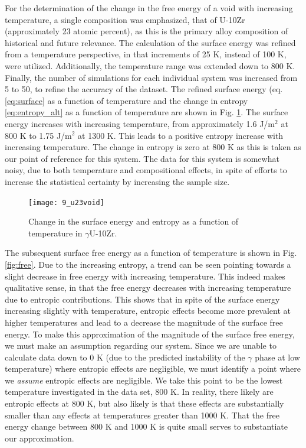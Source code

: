 \documentclass[review]{elsarticle}
\begin{document}
For the determination of the change in the free energy of a void with increasing temperature, a single composition was emphasized, that of U-10Zr (approximately 23 atomic percent), as this is the primary alloy composition of historical and future relevance. The calculation of the surface energy was refined from a temperature perspective, in that increments of 25 K, instead of 100 K, were utilized. Additionally, the temperature range was extended down to 800 K. Finally, the number of simulations for each individual system was increased from 5 to 50, to refine the accuracy of the dataset. The refined surface energy (eq. \ref{eq:surface} as a function of temperature and the change in entropy \ref{eq:entropy_alt} as a function of temperature are shown in Fig. \ref{fig:u23void}. The surface energy increases with increasing temperature, from approximately 1.6 J/m$^2$ at 800 K to 1.75 J/m$^2$ at 1300 K. This leads to a positive entropy increase with increasing temperature. The change in entropy is zero at 800 K as this is taken as our point of reference for this system. The data for this system is somewhat noisy, due to both temperature and compositional effects, in spite of efforts to increase the statistical certainty by increasing the sample size. 
\begin{figure}[!htp]
\begin{center}
\texttt{[image: 9\_u23void]}
\end{center}
\caption{Change in the surface energy and entropy as a function of temperature in $\gamma$U-10Zr.}
\label{fig:u23void}
\end{figure}

The subsequent surface free energy as a function of temperature is shown in Fig. \ref{fig:free}.  Due to the increasing entropy, a trend can be seen pointing towards a slight decrease in free energy with increasing temperature. This indeed makes qualitative sense, in that the free energy decreases with increasing temperature due to entropic contributions. This shows that in spite of the surface energy increasing slightly with temperature, entropic effects become more prevalent at higher temperatures and lead to a decrease the magnitude of the surface free energy. To make this approximation of the magnitude of the surface free energy, we must make an assumption regarding our system. Since we are unable to calculate data down to 0 K (due to the predicted instability of the $\gamma$ phase at low temperature) where entropic effects are negligible, we must identify a point where we \textit{assume} entropic effects are negligible. We take this point to be the lowest temperature investigated in the data set, 800 K. In reality, there likely are entropic effects at 800 K, but also likely is that these effects are substantially smaller than any effects at temperatures greater than 1000 K. That the free energy change between 800 K and 1000 K is quite small serves to substantiate our approximation. 
\end{document}

